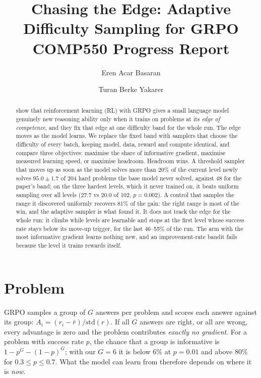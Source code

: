 \documentclass[11pt]{article}
\title{Chasing the Edge: Adaptive Difficulty Sampling for GRPO\\
\large COMP550 Progress Report}
\author{Eren Acar Basaran \and Turan Berke Yakarer}
\begin{document}
\maketitle

\begin{abstract}
\citet{zhang2025interplay} show that reinforcement learning (RL) with GRPO gives a small language model
genuinely new reasoning ability only when it trains on problems at its \emph{edge of competence}, and they
fix that edge at one difficulty band for the whole run. The edge moves as the model learns. We replace the
fixed band with samplers that choose the difficulty of every batch, keeping model, data, reward and compute
identical, and compare three objectives: maximise the share of informative gradient, maximise measured
learning speed, or maximise headroom. Headroom wins. A threshold sampler that moves up as soon as the
model solves more than 20\% of the current level newly solves $95.0\pm1.7$ of 204 hard problems the base
model never solved, against 48 for the paper's band; on the three hardest levels, which it never trained
on, it beats uniform sampling over all levels ($27.7$ vs $20.0$ of 102, $p=0.002$). A control that samples
the range it discovered uniformly recovers 81\% of the gain: the right range is most of the win, and the
adaptive sampler is what found it. It does not track the edge for the whole run: it climbs while levels are
learnable and stops at the first level whose success rate stays below its move-up trigger, for the last
46--55\% of the run. The arm with the most informative gradient learns nothing new, and an
improvement-rate bandit fails because the level it trains rewards itself.
\end{abstract}

\section{Problem}
\label{sec:problem}

GRPO \citep{shao2024deepseekmath} samples a group of $G$ answers per problem and scores each answer against
its group: $A_i = (r_i - \bar r)/\mathrm{std}(r)$. If all $G$ answers are right, or all are wrong, every
advantage is zero and the problem contributes \emph{exactly no gradient}. For a problem with success rate
$p$, the chance that a group is informative is $1-p^G-(1-p)^G$; with our $G=6$ it is below 6\% at $p=0.01$
and above 80\% for $0.3\le p\le0.7$. What the model can learn from therefore depends on where it is
\emph{now}.
\end{document}
